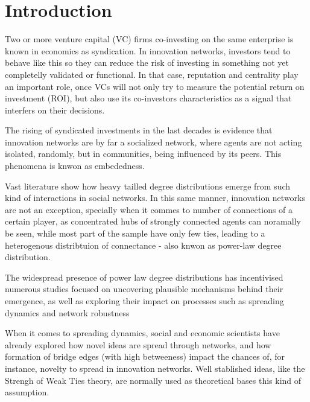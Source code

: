 \section{Introduction}




Two or more venture capital (VC) firms co-investing on the same enterprise is known in economics as syndication. In innovation networks, investors tend to behave like this so they can reduce the risk of investing in something not yet completelly validated or functional. In that case, reputation and centrality play an important role, once VCs will not only try to measure the potential return on investment (ROI), but also use its co-investors characteristics as a signal that interfers on their decisions.

The rising of syndicated investments in the last decades is evidence that innovation networks are by far a socialized network, where agents are not acting isolated, randomly, but in communities, being influenced by its peers. This phenomena is knwon as embededness.

Vast literature show how heavy tailled degree distributions emerge from such kind of interactions in social networks. In this same manner, innovation networks are not an exception, specially when it commes to number of connections of a certain player, as concentrated hubs of strongly connected agents can noramally be seen, while most part of the sample have only few ties, leading to a heterogenous distribtuion of connectance - also knwon as power-law degree distribution.

The widespread presence of power law degree distributions has incentivised numerous studies focused on uncovering plausible mechanisms behind their emergence, as well as exploring their impact on processes such as spreading dynamics \cite{PastorSatorras2001} and network robustness \cite{Albert2000}

When it comes to spreading dynamics, social and economic scientists have already explored how novel ideas are spread through networks, and how formation of bridge edges (with high betweeness) impact the chances of, for instance, novelty to spread in innovation networks. Well stablished ideas, like the Strengh of Weak Ties theory, are normally used as theoretical bases this kind of assumption.

